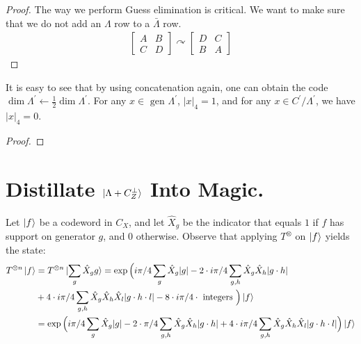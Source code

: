 \documentclass[manuscript,screen,review]{acmart}
\begin{document}
\begin{proof} 
  The way we perform Guess elimination is critical. We want to make sure that we do not add an $\Lambda$ row to a $\bar{\Lambda}$ row. 
  \begin{equation*}
    \begin{split}
      \begin{bmatrix}
        A & B \\ 
        C & D
      \end{bmatrix}	\curvearrowright \begin{bmatrix}
        D & C \\ 
        B & A
      \end{bmatrix}
    \end{split}
  \end{equation*}
\end{proof}


\begin{claim}
  It is easy to see that by using concatenation again, one can obtain the code $\dim \Lambda^{\prime} \leftarrow \frac{1}{2}\dim \Lambda^{\prime}$. For any $x \in \text{ gen } \Lambda^{\prime}$, $|x|_{4} = 1$, and for any $x \in C^{\prime} / \Lambda^{\prime}$, we have $|x|_{4} = 0$.
  \end{claim}

  \begin{proof}
  \end{proof}

  \section{Distillate $\ket{ \Lambda + C_{Z}^{\perp}}$ Into Magic.}
Let $\ket{f}$ be a codeword in $C_{X}$, and let $\hat{X}_{g}$ be the indicator that equals $1$ if $f$ has support on generator $g$, and $0$ otherwise. Observe that applying $T^{\otimes}$ on $\ket{f}$ yields the state:
\begin{equation*}
  \begin{split}
    T^{\otimes n}\ket{f} & =  T^{\otimes n}\ket{\sum_{g} \hat{X}_{g}g } = \exp \Big( i\pi/4 \sum_{g} \hat{X}_{g}|g|  -  2 \cdot i \pi/4 \sum_{g,h} \hat{X}_{g}\hat{X}_{h}|g\cdot h| \\
    & +  4 \cdot i\pi/4 \sum_{g,h} \hat{X}_{g}\hat{X}_{h}\hat{X}_{l}|g\cdot h \cdot l| -   8  \cdot i\pi/4 \cdot \text{ integers } \Big) \ket{f} \\
    & = \exp \Big( i\pi/4 \sum_{g} \hat{X}_{g}|g|  -  2 \cdot \pi/4 \sum_{g,h} \hat{X}_{g}\hat{X}_{h}|g\cdot h| +  4 \cdot i\pi/4 \sum_{g,h} \hat{X}_{g}\hat{X}_{h}\hat{X}_{l}|g\cdot h \cdot l| \Big) \ket{f}
  \end{split}
\end{equation*}
\end{document}
